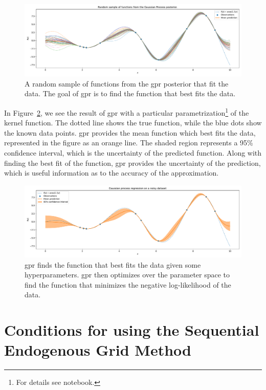 \documentclass{article}
\begin{document}
\begin{figure}[!htbp]
\centering
\includegraphics[width=0.7\linewidth]{files/GPR_Posterior_Sample-9b6facaca677fa20ce5b7ec3f577525a.pdf}
\caption[]{A random sample of functions from the \acrshort{gpr} posterior that fit the data. The goal of \acrshort{gpr} is to find the function that best fits the data.}
\label{fig:gpr_sample}
\end{figure}

In Figure~\ref{fig:gpr}, we see the result of \acrshort{gpr} with a particular parametrization\footnote{For details see notebook.} of the kernel function. The dotted line shows the true function, while the blue dots show the known data points. \acrshort{gpr} provides the mean function which best fits the data, represented in the figure as an orange line. The shaded region represents a 95\% confidence interval, which is the uncertainty of the predicted function. Along with finding the best fit of the function, \acrshort{gpr} provides the uncertainty of the prediction, which is useful information as to the accuracy of the approximation.

\begin{figure}[!htbp]
\centering
\includegraphics[width=0.7\linewidth]{files/GaussianProcessRegre-04804d5d0e20c02302d1bfd03c2945ad.pdf}
\caption[]{\acrshort{gpr} finds the function that best fits the data given some hyperparameters. \acrshort{gpr} then optimizes over the parameter space to find the function that minimizes the negative log-likelihood of the data.}
\label{fig:gpr}
\end{figure}

\section{Conditions for using the Sequential Endogenous Grid Method}\label{conditions}
\end{document}

